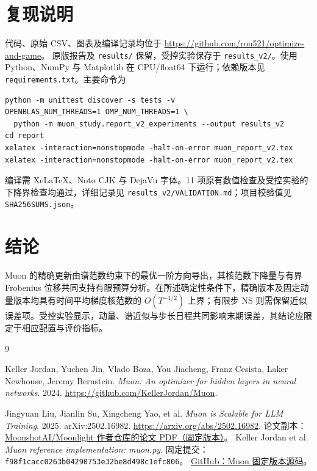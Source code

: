 \documentclass[11pt,a4paper]{article}
\theoremstyle{definition}
\begin{document}
\section{复现说明}
代码、原始 CSV、图表及编译记录均位于
\url{https://github.com/rou521/optimize-and-game}。
原版报告及 \texttt{results/} 保留，受控实验保存于 \texttt{results\_v2/}。使用 Python、NumPy 与 Matplotlib 在 CPU/float64 下运行；依赖版本见 \texttt{requirements.txt}。主要命令为
\begin{verbatim}
python -m unittest discover -s tests -v
OPENBLAS_NUM_THREADS=1 OMP_NUM_THREADS=1 \
  python -m muon_study.report_v2_experiments --output results_v2
cd report
xelatex -interaction=nonstopmode -halt-on-error muon_report_v2.tex
xelatex -interaction=nonstopmode -halt-on-error muon_report_v2.tex
\end{verbatim}
编译需 XeLaTeX、Noto CJK 与 DejaVu 字体。11 项原有数值检查及受控实验的下降界检查均通过，详细记录见 \texttt{results\_v2/VALIDATION.md}；项目校验值见 \texttt{SHA256SUMS.json}。

\section{结论}
Muon 的精确更新由谱范数约束下的最优一阶方向导出，其核范数下降量与有界 Frobenius 位移共同支持有限预算分析。在所述确定性条件下，精确版本及固定动量版本均具有时间平均梯度核范数的 $O(T^{-1/2})$ 上界；有限步 NS 则需保留近似误差项。受控实验显示，动量、谱近似与步长日程共同影响末期误差，其结论应限定于相应配置与评价指标。

\begin{thebibliography}{9}
\raggedright
{} Keller Jordan, Yuchen Jin, Vlado Boza, You Jiacheng, Franz Cesista, Laker Newhouse, Jeremy Bernstein.
\emph{Muon: An optimizer for hidden layers in neural networks}. 2024.
\url{https://github.com/KellerJordan/Muon}.

 Jingyuan Liu, Jianlin Su, Xingcheng Yao, et al.
\emph{Muon is Scalable for LLM Training}. 2025. arXiv:2502.16982.
\url{https://arxiv.org/abs/2502.16982}.
论文副本：
\href{https://github.com/MoonshotAI/Moonlight/blob/c2ad5b20c605086526a179d36901bfc41b52b44b/Moonlight.pdf}{MoonshotAI/Moonlight 作者仓库的论文 PDF（固定版本）}。
\bibitem{code} Keller Jordan et al. \emph{Muon reference implementation: muon.py}.
固定提交：\nolinkurl{f98f1cacc0263b04290753e32be8d498c1efc806}。
\href{https://github.com/KellerJordan/Muon/blob/f98f1cacc0263b04290753e32be8d498c1efc806/muon.py}{GitHub：Muon 固定版本源码}。
\end{thebibliography}
\end{document}

